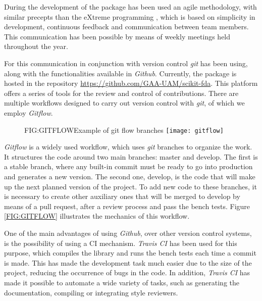 During the development of the package has been used an agile methodology, with
similar precepts than the eXtreme programming \cite{eXtreme}, which is based on
simplicity in development, continuous feedback and communication between
team members. This communication has been possible by means of weekly meetings held throughout the year.

For this communication in conjunction with version control \textit{git} has been using,
along with the functionalities available in \textit{Github}. 
Currently, the package is hosted in the repository \href{https://github.com/GAA-UAM/scikit-fda}{https://github.com/GAA-UAM/scikit-fda}.
 This platform offers a
series of tools for the review and control of contributions. There are multiple
workflows designed to carry out version control with \textit{git}, of which we employ
\textit{Gitflow}.


\begin{figure}[Example of git flow branches]{FIG:GITFLOW}{Example of git flow branches \footnotemark}
	\texttt{[image: gitflow]}
\end{figure}

\textit{Gitflow} is a widely used workflow, which uses \textit{git} branches to organize the work.
It structures the code around two main branches: master and develop. The first
is a stable branch, where any built-in commit must be ready to go into
production and generates a new version. The second one, develop, is the code
that will make up the next planned version of the project. To add new code to
these branches, it is necessary to create other auxiliary ones that will be
merged to develop by means of a pull request, after a review process and pass
the bench tests. Figure \ref{FIG:GITFLOW} illustrates the mechanics of this
workflow.




One of the main advantages of using \textit{Github}, over other version control systems,
is the possibility of using a \ac{CI} mechanism. \textit{Travis CI} has
been used for this purpose, 
which compiles the library and runs the bench tests
each time a commit is made. This has made the development task much easier due to the size of the project, reducing the occurrence of bugs in the code.
In addition, \textit{Travis CI} has made it possible to automate a wide variety of tasks, such as generating the
documentation, compiling or integrating style reviewers.


